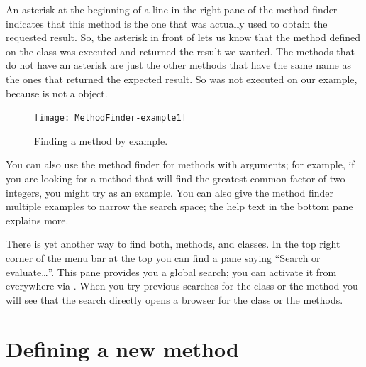 \documentclass[a4paper,10pt,twoside]{book}
\begin{document}
An asterisk at the beginning of a line in the right pane of the method finder indicates that this method is the one that was actually used to obtain the requested result.
So, the asterisk in front of  lets us know that the method  defined on the class  was executed and returned the result we wanted.
The methods that do not have an asterisk are just the other methods that have the same name as the ones that returned the expected result.
So  was not executed on our example, because  is not a  object.

\begin{figure}[hbt]
\centerline {\texttt{[image: MethodFinder-example1]}}
\caption{Finding a method by example.
\label{fig:methodFinder-example1}}
\end{figure}

You can also use the method finder for methods with arguments; for example, if you are looking for a method that will find the greatest common factor of two integers, you might try  as an example.
You can also give the method finder multiple examples to narrow the search space; the help text in the bottom pane explains more.

There is yet another way to find both, methods, and classes.
In the top right corner of the menu bar at the top you can find a pane saying ``Search or evaluate\ldots''.
This pane provides you a global search; you can activate it from everywhere via .
When you try previous searches for the class  or the method  you will see that the search directly opens a browser for the class or the methods.

\section{Defining a new method}
\end{document}
